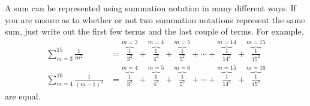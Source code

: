 A sum can be represented using summation notation in many different ways.
If you are unsure as to whether or not two summation notations
represent the same sum, just write out the first few terms and the last
couple of terms. For example,
\begin{align*}
\sum_{m=3}^{15} \frac{1}{m^2}
&=\overbrace{\frac{1}{3^2}}^{m=3}
  +\overbrace{\frac{1}{4^2}}^{m=4}
  +\overbrace{\frac{1}{5^2}}^{m=5}
  +\cdots
  +\overbrace{\frac{1}{14^2}}^{m=14}
  +\overbrace{\frac{1}{15^2}}^{m=15} \\
\sum_{m=4}^{16} \frac{1}{(m-1)^2}
&=\overbrace{\frac{1}{3^2}}^{m=4}
  +\overbrace{\frac{1}{4^2}}^{m=5}
  +\overbrace{\frac{1}{5^2}}^{m=6}
  +\cdots
  +\overbrace{\frac{1}{14^2}}^{m=15}
  +\overbrace{\frac{1}{15^2}}^{m=16}
\end{align*}
are equal.




